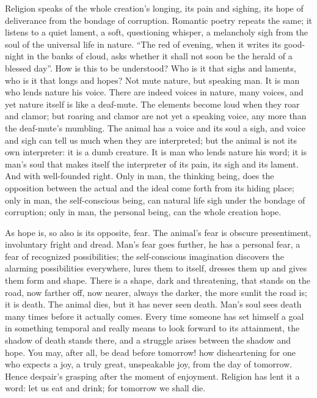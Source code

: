 \documentclass[12pt,a4paper,openany]{book}
\newcommand{\opage}[1]{\marginnote{\footnotesize\textit{[#1]}}}
\begin{document}
Religion speaks of the whole creation's longing, its pain and sighing, its hope of deliverance
from the bondage of corruption. Romantic poetry repeats the same; it listens to a quiet
lament, a soft, questioning whisper, a melancholy sigh from the soul of the universal life in
nature. ``The red of evening, when it writes its good-night in the banks of cloud, asks whether
it shall not soon be the herald of a blessed day''. How is this to be understood? Who is it that
sighs and laments, who is it that longs and hopes? Not mute nature, but speaking man. It is
man who lends nature his voice. There are indeed voices in nature,
\setcounter{footnote}{0}%
\opage{36}many voices, and yet nature itself is like a deaf-mute. The elements become loud when
they roar and clamor; but roaring and clamor are not yet a speaking voice, any more than the
deaf-mute's mumbling. The animal has a voice and its soul a sigh, and voice and sigh can tell
us much when they are interpreted; but the animal is not its own interpreter: it is a dumb
creature. It is man who lends nature his word; it is man's soul that makes itself the
interpreter of its pain, its sigh and its lament. And with well-founded right. Only in man,
the thinking being, does the opposition between the actual and the ideal come forth from its
hiding place; only in man, the self-conscious being, can natural life sigh under the bondage
of corruption; only in man, the personal being, can the whole creation hope.

As hope is, so also is its opposite, fear. The animal's fear is obscure presentiment,
involuntary fright and dread. Man's fear goes further, he has a personal fear, a fear of
recognized possibilities; the self-conscious imagination discovers the alarming possibilities
everywhere, lures them to itself, dresses them up and gives them form and shape. There is a
shape, dark and threatening, that stands on the road, now farther off, now nearer, always the
darker, the more sunlit the road is; it is death. The animal dies, but it has never seen death.
Man's soul sees death many times before it actually comes. Every time someone has set himself
a goal in something temporal and really means to look forward to its attainment, the shadow of
death stands there, and a struggle arises between the shadow and hope. You may, after all, be
dead before tomorrow! how disheartening for one who expects a joy, a truly great, unspeakable
joy, from the
\setcounter{footnote}{0}%
\opage{37}day of tomorrow. Hence despair's grasping after the moment of enjoyment. Religion has
lent it a word: let us eat and drink; for tomorrow we shall die.
\end{document}
